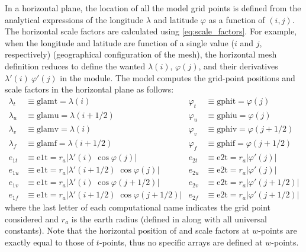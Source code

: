 \documentclass[../main/NEMO_manual]{subfiles}
\begin{document}
In a horizontal plane, the location of all the model grid points is defined from
the analytical expressions of the longitude $\lambda$ and latitude $\varphi$ as a function of $(i,j)$.
The horizontal scale factors are calculated using \autoref{eq:scale_factors}.
For example, when the longitude and latitude are function of a single value
($i$ and $j$, respectively) (geographical configuration of the mesh),
the horizontal mesh definition reduces to define the wanted $\lambda(i)$, $\varphi(j)$,
and their derivatives $\lambda'(i) \ \varphi'(j)$ in the  module.
The model computes the grid-point positions and scale factors in the horizontal plane as follows:
\begin{align*}
   \lambda_t &\equiv \text{glamt} =      \lambda (i      )
  &\varphi_t &\equiv \text{gphit} =      \varphi (j      ) \\
   \lambda_u &\equiv \text{glamu} =      \lambda (i + 1/2)
  &\varphi_u &\equiv \text{gphiu} =      \varphi (j      ) \\
   \lambda_v &\equiv \text{glamv} =      \lambda (i      )
  &\varphi_v &\equiv \text{gphiv} =      \varphi (j + 1/2) \\
   \lambda_f &\equiv \text{glamf} =      \lambda (i + 1/2)
  &\varphi_f &\equiv \text{gphif} =      \varphi (j + 1/2) \\
   e_{1t}    &\equiv \text{e1t}   = r_a |\lambda'(i      ) \; \cos\varphi(j      ) |
  &e_{2t}    &\equiv \text{e2t}   = r_a |\varphi'(j      )                         | \\
   e_{1u}    &\equiv \text{e1t}   = r_a |\lambda'(i + 1/2) \; \cos\varphi(j      ) |
  &e_{2u}    &\equiv \text{e2t}   = r_a |\varphi'(j      )                         | \\
   e_{1v}    &\equiv \text{e1t}   = r_a |\lambda'(i      ) \; \cos\varphi(j + 1/2) |
  &e_{2v}    &\equiv \text{e2t}   = r_a |\varphi'(j + 1/2)                         | \\
   e_{1f}    &\equiv \text{e1t}   = r_a |\lambda'(i + 1/2) \; \cos\varphi(j + 1/2) |
  &e_{2f}    &\equiv \text{e2t}   = r_a |\varphi'(j + 1/2)                         |
\end{align*}
where the last letter of each computational name indicates the grid point considered and
$r_a$ is the earth radius (defined in  along with all universal constants).
Note that the horizontal position of and scale factors at $w$-points are exactly equal to those of $t$-points,
thus no specific arrays are defined at $w$-points.
\end{document}
